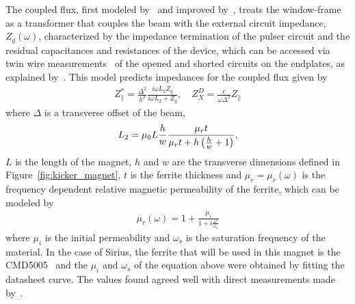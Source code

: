    The coupled flux, first modeled by~ and improved by~, treats the window-frame as a transformer that couples the beam with the external circuit impedance, $Z_g(\omega)$, characterized by the impedance termination of the pulser circuit and the residual capacitances and resistances of the device, which can be accessed via twin wire measurements~\cite{Mostacci2016} of the opened and shorted circuits on the endplates, as explained by~. This model predicts impedances for the coupled flux given by
    \begin{align}\label{eq:coupled_flux_impedance}
        Z_\parallel^* = \frac{\Delta^2}{h^2}\frac{i\omega L_2 Z_g}{i\omega L_2 + Z_g},
        \quad Z_X^D = \frac{c}{\omega\Delta^2}Z_\parallel
    \end{align}
    where $\Delta$ is a transverse offset of the beam,
    \begin{align}
        L_2 = \mu_0L\frac{h}{w}\frac{\mu_rt}{\mu_rt+h\left(\frac{h}{w}+1\right)},
    \end{align}
    $L$ is the length of the magnet, $h$ and $w$ are the transverse dimensions defined in Figure~\ref{fig:kicker_magnet}, $t$ is the ferrite thickness and $\mu_r = \mu_r(\omega)$ is the frequency dependent relative magnetic permeability of the ferrite, which can be modeled by
    \begin{align}
        \mu_r(\omega) = 1 + \frac{\mu_i}{1+i\frac{\omega}{\omega_s}}
    \end{align}
    where $\mu_i$ is the initial permeability and $\omega_s$ is the saturation frequency of the material. In the case of Sirius, the ferrite that will be used in this magnet is the CMD5005~\cite{CeramicMagnets2017} and the $\mu_i$ and $\omega_s$ of the equation above were obtained by fitting the datasheet curve. The values found agreed well with direct measurements made by~.

